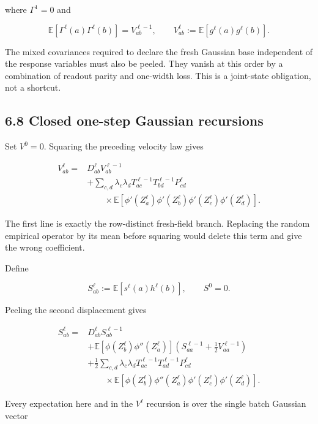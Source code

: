 where \(\Gamma^1=0\) and

\[
\mathbb E[\Gamma^\ell(a)\Gamma^\ell(b)]
=
V^{\ell-1}_{ab},
\qquad
V^\ell_{ab}
:=
\mathbb E[g^\ell(a)g^\ell(b)].
\]


The mixed covariances required to declare the fresh Gaussian base independent
of the response variables must also be peeled. They vanish at this order by a
combination of readout parity and one-width loss. This is a joint-state
obligation, not a shortcut.

\subsection*{6.8 Closed one-step Gaussian recursions}


Set \(V^0=0\). Squaring the preceding velocity law gives

\[
\boxed{
\begin{aligned}
V^\ell_{ab}
={}&
D^\ell_{ab}V^{\ell-1}_{ab}
\\
&+
\sum_{c,d}
\lambda_c\lambda_d
T^{\ell-1}_{ac}T^{\ell-1}_{bd}P^\ell_{cd}
\\
&\qquad\times
\mathbb E\left[
\phi'(Z^\ell_a)\phi'(Z^\ell_b)
\phi'(Z^\ell_c)\phi'(Z^\ell_d)
\right].
\end{aligned}
}
\]


The first line is exactly the row-distinct fresh-field branch. Replacing the
random empirical operator by its mean before squaring would delete this term
and give the wrong coefficient.

Define

\[
S^\ell_{ab}
:=
\mathbb E[s^\ell(a)h^\ell(b)],
\qquad
S^0=0.
\]


Peeling the second displacement gives

\[
\boxed{
\begin{aligned}
S^\ell_{ab}
={}&
D^\ell_{ab}S^{\ell-1}_{ab}
\\
&+
\mathbb E[
\phi(Z^\ell_b)\phi''(Z^\ell_a)]
\left(S^{\ell-1}_{aa}+\frac12V^{\ell-1}_{aa}\right)
\\
&+
\frac12\sum_{c,d}
\lambda_c\lambda_d
T^{\ell-1}_{ac}T^{\ell-1}_{ad}P^\ell_{cd}
\\
&\qquad\times
\mathbb E\left[
\phi(Z^\ell_b)\phi''(Z^\ell_a)
\phi'(Z^\ell_c)\phi'(Z^\ell_d)
\right].
\end{aligned}
}
\]


Every expectation here and in the \(V^\ell\) recursion is over the single
batch Gaussian vector

